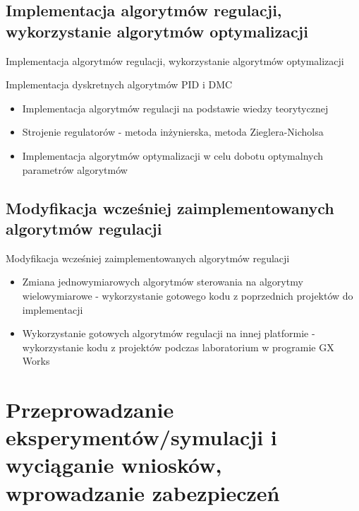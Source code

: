 \documentclass{beamer}
\begin{document}
	\subsection{Implementacja algorytmów regulacji, wykorzystanie algorytmów optymalizacji}
	\begin{frame}{Implementacja algorytmów regulacji, wykorzystanie algorytmów optymalizacji}
		\begin{block}{Implementacja dyskretnych algorytmów PID i DMC}
			\begin{itemize}
				\item Implementacja algorytmów regulacji na podstawie wiedzy teorytycznej
				\item Strojenie regulatorów - metoda inżynierska, metoda Zieglera-Nicholsa
				\item Implementacja algorytmów optymalizacji w celu dobotu optymalnych parametrów algorytmów
			\end{itemize}
		\end{block}
	\end{frame}
	
	\subsection{Modyfikacja wcześniej zaimplementowanych algorytmów regulacji}
	\begin{frame}{Modyfikacja wcześniej zaimplementowanych algorytmów regulacji}
		\begin{itemize}
			\item Zmiana jednowymiarowych algorytmów sterowania na algorytmy wielowymiarowe - wykorzystanie gotowego kodu z poprzednich projektów do implementacji
			\item Wykorzystanie gotowych algorytmów regulacji na innej platformie - wykorzystanie kodu z projektów podczas laboratorium w programie GX Works
		\end{itemize}
	\end{frame}

\section{Przeprowadzanie eksperymentów/symulacji i wyciąganie wniosków, wprowadzanie zabezpieczeń}
\end{document}
